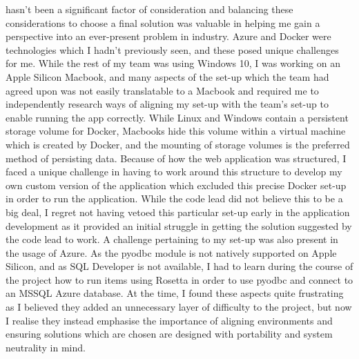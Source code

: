 \documentclass{scrreprt}
\begin{document}
hasn't been a significant factor of consideration and balancing these considerations to choose a final solution was valuable in helping me gain a perspective into an ever-present problem in industry.
\newline
\newline
Azure and Docker were technologies which I hadn't previously seen, and these posed unique challenges for me. While the rest of my team was using Windows 10, I was working on an Apple Silicon Macbook, and many aspects of the set-up which the team had agreed upon was not easily translatable to a Macbook and required me to independently research ways of aligning my set-up with the team's set-up to enable running the app correctly. While Linux and Windows contain a persistent storage volume for Docker, Macbooks hide this volume within a virtual machine which is created by Docker, and the mounting of storage volumes is the preferred method of persisting data. Because of how the web application was structured, I faced a unique challenge in having to work around this structure to develop my own custom version of the application which excluded this precise Docker set-up in order to run the application. While the code lead did not believe this to be a big deal, I regret not having vetoed this particular set-up early in the application development as it provided an initial struggle in getting the solution suggested by the code lead to work. A challenge pertaining to my set-up was also present in the usage of Azure. As the pyodbc module is not natively supported on Apple Silicon, and as SQL Developer is not available, I had to learn during the course of the project how to run items using Rosetta in order to use pyodbc and connect to an MSSQL Azure database. At the time, I found these aspects quite frustrating as I believed they added an unnecessary layer of difficulty to the project, but now I realise they instead emphasise the importance of aligning environments and ensuring solutions which are chosen are designed with portability and system neutrality in mind.
\newline
\newline
\end{document}
